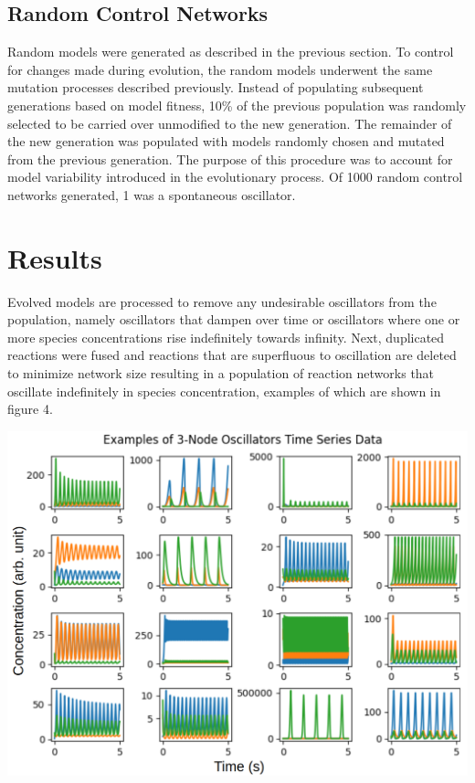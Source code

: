 \documentclass[12pt]{report}
\begin{document}
\subsection{Random Control Networks}
Random models were generated as described in the previous section. To control for changes made during evolution, the random models underwent the same mutation processes described previously. Instead of populating subsequent generations based on model fitness, 10\% of the previous population was randomly selected to be carried over unmodified to the new generation. The remainder of the new generation was populated with models randomly chosen and mutated from the previous generation. The purpose of this procedure was to account for model variability introduced in the evolutionary process. Of 1000 random control networks generated, 1 was a spontaneous oscillator.

\section{Results}
Evolved models are processed to remove any undesirable oscillators from the population, namely oscillators that dampen over time or oscillators where one or more species concentrations rise indefinitely towards infinity. Next,  duplicated reactions were fused and reactions that are superfluous to oscillation are deleted to minimize network size resulting in a population of reaction networks that oscillate indefinitely in species concentration, examples of which are shown in figure 4.

\begin{center}
    \includegraphics[width=15cm]{images/examples.png}
    \label{fig:examples}
\end{center}
\end{document}
